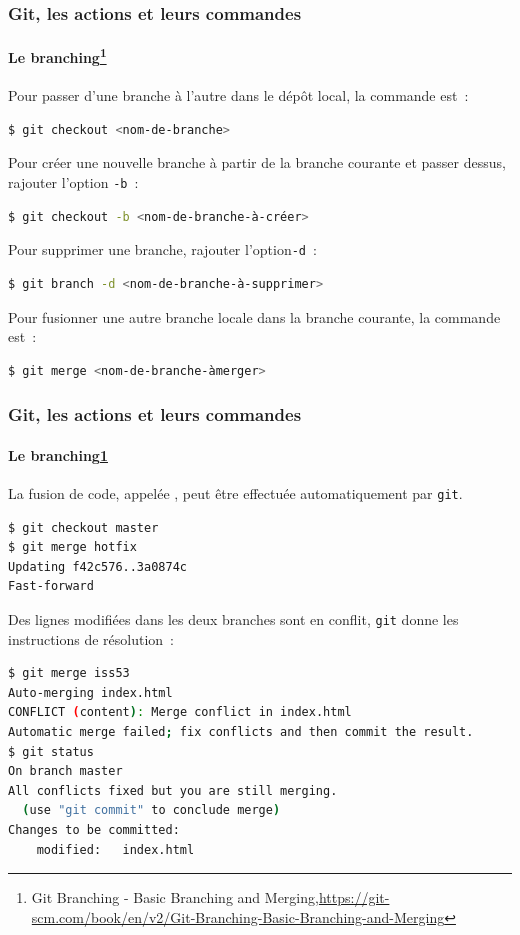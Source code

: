 \documentclass{beamer}
\begin{document}
    \begin{frame}[fragile]
        \frametitle{Git, les actions et leurs commandes}
        \framesubtitle{Le branching\footnote{\label{progitmerge}Git Branching - Basic Branching and Merging,\url{https://git-scm.com/book/en/v2/Git-Branching-Basic-Branching-and-Merging}}}
        \transdissolve

        Pour passer d'une branche à l'autre dans le dépôt local, la commande est~:
        \begin{lstlisting}[language=sh]
$ git checkout <nom-de-branche>
        \end{lstlisting}

        Pour créer une nouvelle branche à partir de la branche courante et passer dessus, rajouter l'option \lstinline{-b}~:
        \begin{lstlisting}[language=sh]
$ git checkout -b <nom-de-branche-à-créer>
        \end{lstlisting}

        Pour supprimer une branche, rajouter l'option\lstinline{-d}~:
        \begin{lstlisting}[language=sh]
$ git branch -d <nom-de-branche-à-supprimer>
        \end{lstlisting}

        Pour fusionner une autre branche locale dans la branche courante, la commande est~:
        \begin{lstlisting}[language=sh]
$ git merge <nom-de-branche-àmerger>
        \end{lstlisting}
    \end{frame}

    \begin{frame}[fragile]
        \frametitle{Git, les actions et leurs commandes}
        \framesubtitle{Le branching\cref{progitmerge}}
        \transdissolve

        La fusion de code, appelée , peut être effectuée automatiquement par \lstinline{git}.
        \begin{lstlisting}[language=sh]
$ git checkout master
$ git merge hotfix
Updating f42c576..3a0874c
Fast-forward
        \end{lstlisting}

        Des lignes modifiées dans les deux branches sont en conflit, \lstinline{git} donne les instructions de résolution~:
        \begin{lstlisting}[language=sh]
$ git merge iss53
Auto-merging index.html
CONFLICT (content): Merge conflict in index.html
Automatic merge failed; fix conflicts and then commit the result.
$ git status
On branch master
All conflicts fixed but you are still merging.
  (use "git commit" to conclude merge)
Changes to be committed:
    modified:   index.html
        \end{lstlisting}
    \end{frame}
\end{document}
